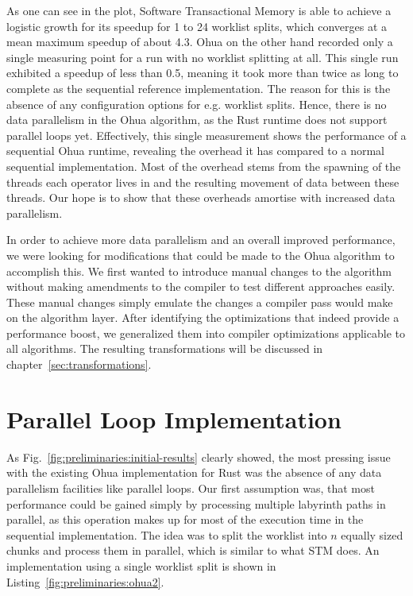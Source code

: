 As one can see in the plot, Software Transactional Memory is able to achieve a logistic growth for its speedup for 1 to 24 worklist splits, which converges at a mean maximum speedup of about 4.3.
Ohua on the other hand recorded only a single measuring point for a run with no worklist splitting at all.
This single run exhibited a speedup of less than 0.5, meaning it took more than twice as long to complete as the sequential reference implementation.
The reason for this is the absence of any configuration options for e.g. worklist splits.
Hence, there is no data parallelism in the Ohua algorithm, as the Rust runtime does not support parallel loops yet.
Effectively, this single measurement shows the performance of a sequential Ohua runtime, revealing the overhead it has compared to a normal sequential implementation.
Most of the overhead stems from the spawning of the threads each operator lives in and the resulting movement of data between these threads.
Our hope is to show that these overheads amortise with increased data parallelism.

In order to achieve more data parallelism and an overall improved performance, we were looking for modifications that could be made to the Ohua algorithm to accomplish this.
We first wanted to introduce manual changes to the algorithm without making amendments to the compiler to test different approaches easily.
These manual changes simply emulate the changes a compiler pass would make on the algorithm layer.
After identifying the optimizations that indeed provide a performance boost, we generalized them into compiler optimizations applicable to all algorithms.
The resulting transformations will be discussed in chapter~\ref{sec:transformations}.


\section{Parallel Loop Implementation}

As Fig.~\ref{fig:preliminaries:initial-results} clearly showed, the most pressing issue with the existing Ohua implementation for Rust was the absence of any data parallelism facilities like parallel loops.
Our first assumption was, that most performance could be gained simply by processing multiple labyrinth paths in parallel, as this operation makes up for most of the execution time in the sequential implementation.
The idea was to split the worklist into $n$ equally sized chunks and process them in parallel, which is similar to what STM does.
An implementation using a single worklist split is shown in Listing~\ref{fig:preliminaries:ohua2}.

